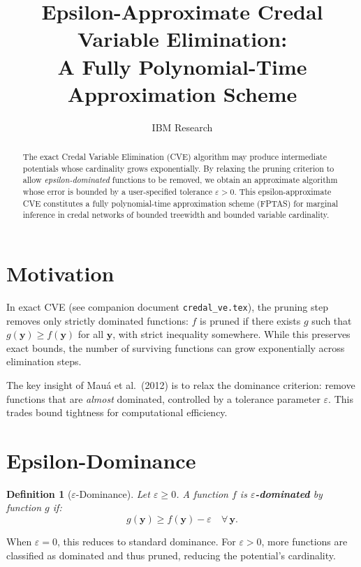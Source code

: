 \documentclass[11pt]{article}
\title{Epsilon-Approximate Credal Variable Elimination:\\
A Fully Polynomial-Time Approximation Scheme}
\author{IBM Research}
\date{}
\newtheorem{definition}{Definition}
\begin{document}
\maketitle

\begin{abstract}
The exact Credal Variable Elimination (CVE) algorithm may produce intermediate
potentials whose cardinality grows exponentially. By relaxing the pruning criterion
to allow \emph{epsilon-dominated} functions to be removed, we obtain an approximate
algorithm whose error is bounded by a user-specified tolerance $\varepsilon > 0$.
This epsilon-approximate CVE constitutes a fully polynomial-time approximation scheme
(FPTAS) for marginal inference in credal networks of bounded treewidth and bounded
variable cardinality.
\end{abstract}

\section{Motivation}

In exact CVE (see companion document \texttt{credal\_ve.tex}), the pruning step removes
only strictly dominated functions: $f$ is pruned if there exists $g$ such that
$g(\mathbf{y}) \geq f(\mathbf{y})$ for all $\mathbf{y}$, with strict inequality
somewhere. While this preserves exact bounds, the number of surviving functions can
grow exponentially across elimination steps.

The key insight of Mau\'a et al.\ (2012) is to relax the dominance criterion: remove
functions that are \emph{almost} dominated, controlled by a tolerance parameter
$\varepsilon$. This trades bound tightness for computational efficiency.

\section{Epsilon-Dominance}

\begin{definition}[$\varepsilon$-Dominance]
Let $\varepsilon \geq 0$. A function $f$ is \textbf{$\varepsilon$-dominated} by
function $g$ if:
\begin{equation}\label{eq:eps-dom}
  g(\mathbf{y}) \geq f(\mathbf{y}) - \varepsilon \quad \forall\, \mathbf{y}.
\end{equation}
\end{definition}

When $\varepsilon = 0$, this reduces to standard dominance. For $\varepsilon > 0$,
more functions are classified as dominated and thus pruned, reducing the potential's
cardinality.
\end{document}
